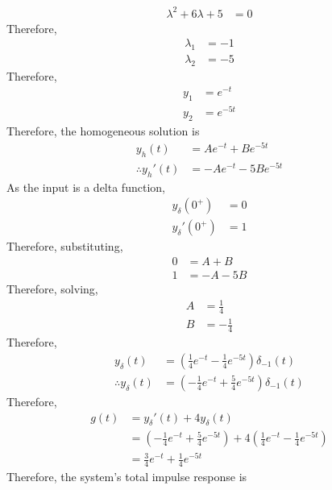 \documentclass[fleqn, a4paper, 11pt, oneside]{amsart}
\theoremstyle{definition}
\theoremstyle{theorem}
\begin{document}
\begin{solution}
\begin{enumerate}[leftmargin=*]
\begin{align*}
				\lambda^2 + 6 \lambda + 5 & = 0
			\end{align*}
			Therefore,
			\begin{align*}
				\lambda_1 & = -1 \\
				\lambda_2 & = -5
			\end{align*}
			Therefore,
			\begin{align*}
				y_1 & = e^{-t} \\
				y_2 & = e^{-5 t}
			\end{align*}
			Therefore, the homogeneous solution is
			\begin{align*}
				y_h(t)               & = A e^{-t} + B e^{-5 t} \\
				\therefore {y_h}'(t) & = -A e^{-t} - 5 B e^{-5 t}
			\end{align*}
			As the input is a delta function,
			\begin{align*}
				y_{\delta}(0^+)    & = 0 \\
				{y_{\delta}}'(0^+) & = 1
			\end{align*}
			Therefore, substituting,
			\begin{align*}
				0 & = A + B \\
				1 & = -A - 5 B
			\end{align*}
			Therefore, solving,
			\begin{align*}
				A & = \frac{1}{4} \\
				B & = -\frac{1}{4}
			\end{align*}
			Therefore,
			\begin{align*}
				y_{\delta}(t)              & = \left( \frac{1}{4} e^{-t} - \frac{1}{4} e^{-5 t} \right) \delta_{-1}(t) \\
				\therefore {y_{\delta}}(t) & = \left( -\frac{1}{4} e^{-t} + \frac{5}{4} e^{-5 t} \right) \delta_{-1}(t)
			\end{align*}
			Therefore,
			\begin{align*}
				g(t) & = {y_{\delta}}'(t) + 4 y_{\delta}(t)                                                                                     \\
                                     & = \left( -\frac{1}{4} e^{-t} + \frac{5}{4} e^{-5 t} \right) + 4 \left( \frac{1}{4} e^{-t} - \frac{1}{4} e^{-5 t} \right) \\
                                     & = \frac{3}{4} e^{-t} + \frac{1}{4} e^{-5 t}
			\end{align*}
			Therefore, the system's total impulse response is
			\begin{align*}

\end{align*}
\end{enumerate}
\end{solution}
\end{document}
